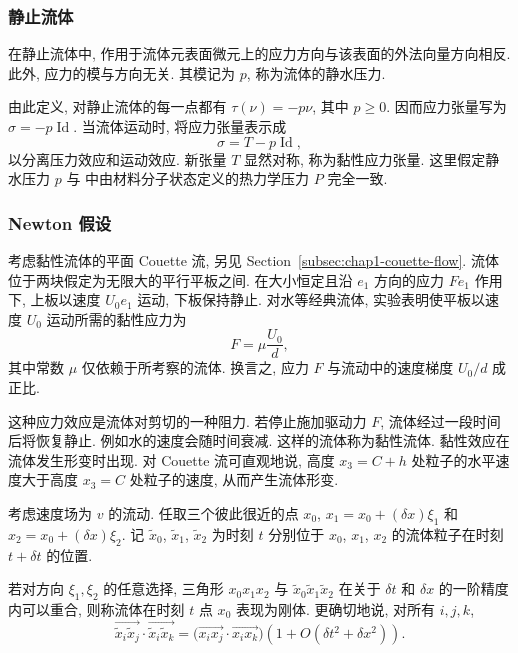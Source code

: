 \subsubsection{静止流体}
\label{subsec:chap1-fluids-at-rest}

\begin{Definition}
\label{def:chap1-hydrostatic-pressure}
在静止流体中, 作用于流体元表面微元上的应力方向与该表面的外法向量方向相反. 此外, 应力的模与方向无关. 其模记为 $p$, 称为流体的静水压力.
\end{Definition}

由此定义, 对静止流体的每一点都有 $\tau(\nu)=-p\nu$, 其中 $p\geq0$. 因而应力张量写为 $\sigma=-p\operatorname{Id}$. 当流体运动时, 将应力张量表示成
\[
  \sigma=T-p\operatorname{Id},
\]
以分离压力效应和运动效应. 新张量 $T$ 显然对称, 称为黏性应力张量. 这里假定静水压力 $p$ 与 中由材料分子状态定义的热力学压力 $P$ 完全一致.

\subsubsection{Newton 假设}
\label{subsec:chap1-newton-hypothesis}

考虑黏性流体的平面 Couette 流, 另见 Section~\ref{subsec:chap1-couette-flow}. 流体位于两块假定为无限大的平行平板之间. 在大小恒定且沿 $e_1$ 方向的应力 $Fe_1$ 作用下, 上板以速度 $U_0e_1$ 运动, 下板保持静止. 对水等经典流体, 实验表明使平板以速度 $U_0$ 运动所需的黏性应力为
\begin{equation}
\label{eq:chap1-couette-stress}
  F=\mu\frac{U_0}{d},
\end{equation}
其中常数 $\mu$ 仅依赖于所考察的流体. 换言之, 应力 $F$ 与流动中的速度梯度 $U_0/d$ 成正比.

这种应力效应是流体对剪切的一种阻力. 若停止施加驱动力 $F$, 流体经过一段时间后将恢复静止. 例如水的速度会随时间衰减. 这样的流体称为黏性流体. 黏性效应在流体发生形变时出现. 对 Couette 流可直观地说, 高度 $x_3=C+h$ 处粒子的水平速度大于高度 $x_3=C$ 处粒子的速度, 从而产生流体形变.

\begin{Definition}
\label{def:chap1-rigid-body-behaviour}
考虑速度场为 $v$ 的流动. 任取三个彼此很近的点 $x_0$, $x_1=x_0+(\delta x)\xi_1$ 和 $x_2=x_0+(\delta x)\xi_2$. 记 $\widetilde x_0$, $\widetilde x_1$, $\widetilde x_2$ 为时刻 $t$ 分别位于 $x_0$, $x_1$, $x_2$ 的流体粒子在时刻 $t+\delta t$ 的位置.

若对方向 $\xi_1,\xi_2$ 的任意选择, 三角形 $x_0x_1x_2$ 与 $\widetilde x_0\widetilde x_1\widetilde x_2$ 在关于 $\delta t$ 和 $\delta x$ 的一阶精度内可以重合, 则称流体在时刻 $t$ 点 $x_0$ 表现为刚体. 更确切地说, 对所有 $i,j,k$,
\begin{equation}
\label{eq:chap1-rigid-body-inner-product}
  \overrightarrow{\widetilde x_i\widetilde x_j}\cdot\overrightarrow{\widetilde x_i\widetilde x_k}
  =\bigl(\overrightarrow{x_ix_j}\cdot\overrightarrow{x_ix_k}\bigr)
  \left(1+O(\delta t^2+\delta x^2)\right).
\end{equation}
\end{Definition}

